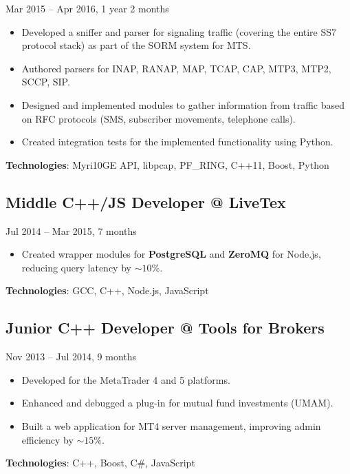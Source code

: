 \documentclass[a4paper,12pt]{article}
\begin{document}
\quad Mar 2015 – Apr 2016, 1 year 2 months

\begin{itemize}[leftmargin=15pt]
    \item Developed a sniffer and parser for signaling traffic (covering the entire SS7 protocol stack) as part of the SORM system for MTS.
    \item Authored parsers for INAP, RANAP, MAP, TCAP, CAP, MTP3, MTP2, SCCP, SIP.
    \item Designed and implemented modules to gather information from traffic based on RFC protocols (SMS, subscriber movements, telephone calls).
    \item Created integration tests for the implemented functionality using Python.
\end{itemize}

\textbf{Technologies}: Myri10GE API, libpcap, PF\_RING, C++11, Boost, Python

\vspace{3mm}

\subsection*{Middle C++/JS Developer @ LiveTex}

\quad Jul 2014 – Mar 2015, 7 months

\begin{itemize}[leftmargin=15pt]
    \item Created wrapper modules for \textbf{PostgreSQL} and \textbf{ZeroMQ} for Node.js, reducing query latency by \(\sim 10\%\).
\end{itemize}

\textbf{Technologies}: GCC, C++, Node.js, JavaScript

\vspace{3mm}

\subsection*{Junior C++ Developer @ Tools for Brokers} 

\quad Nov 2013 – Jul 2014, 9 months

\begin{itemize}[leftmargin=15pt]
    \item Developed for the MetaTrader 4 and 5 platforms.
    \item Enhanced and debugged a plug-in for mutual fund investments (UMAM).
    \item Built a web application for MT4 server management, improving admin efficiency by \(\sim 15\%\).
\end{itemize}

\textbf{Technologies}: C++, Boost, C\#, JavaScript
\end{document}
